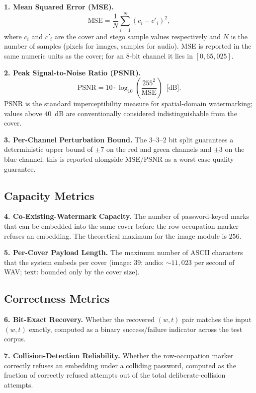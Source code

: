 \textbf{1. Mean Squared Error (MSE).}
\begin{equation}
    \mathrm{MSE} = \frac{1}{N}\sum_{i=1}^{N}(c_i - c'_i)^2,
\end{equation}
where $c_i$ and $c'_i$ are the cover and stego sample values respectively and $N$ is the number of samples (pixels for images, samples for audio). MSE is reported in the same numeric units as the cover; for an 8-bit channel it lies in $[0, 65{,}025]$.

\textbf{2. Peak Signal-to-Noise Ratio (PSNR).}
\begin{equation}
    \mathrm{PSNR} = 10 \cdot \log_{10}\!\left(\frac{255^2}{\mathrm{MSE}}\right) \enspace \text{[dB]}.
\end{equation}
PSNR is the standard imperceptibility measure for spatial-domain watermarking; values above $40$~dB are conventionally considered indistinguishable from the cover.

\textbf{3. Per-Channel Perturbation Bound.} The 3--3--2 bit split guarantees a deterministic upper bound of $\pm 7$ on the red and green channels and $\pm 3$ on the blue channel; this is reported alongside MSE/PSNR as a worst-case quality guarantee.

\subsection{Capacity Metrics}

\textbf{4. Co-Existing-Watermark Capacity.} The number of password-keyed marks that can be embedded into the same cover before the row-occupation marker refuses an embedding. The theoretical maximum for the image module is $256$.

\textbf{5. Per-Cover Payload Length.} The maximum number of ASCII characters that the system embeds per cover (image: $39$; audio: $\sim 11{,}023$ per second of WAV; text: bounded only by the cover size).

\subsection{Correctness Metrics}

\textbf{6. Bit-Exact Recovery.} Whether the recovered $(w, t)$ pair matches the input $(w, t)$ exactly, computed as a binary success/failure indicator across the test corpus.

\textbf{7. Collision-Detection Reliability.} Whether the row-occupation marker correctly refuses an embedding under a colliding password, computed as the fraction of correctly refused attempts out of the total deliberate-collision attempts.

